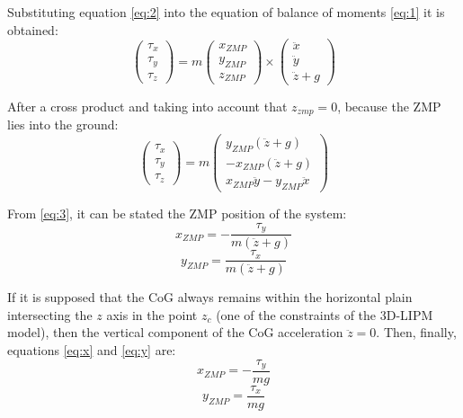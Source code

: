 Substituting equation \eqref{eq:2} into the equation of balance of moments \eqref{eq:1} it is obtained:
\begin{equation}
\begin{pmatrix}
\tau_x \\
\tau_y \\
\tau_z 
\end{pmatrix} 
= m
\begin{pmatrix}
x_{ZMP} \\
y_{ZMP} \\
z_{ZMP}
\end{pmatrix}
\times
\begin{pmatrix}
\ddot{x} \\
\ddot{y} \\
\ddot{z} + g
\end{pmatrix}
\end{equation}

After a cross product and taking into account that $z_{zmp} = 0$, because the ZMP lies into the ground:
\begin{equation}
\begin{pmatrix}
\tau_x \\
\tau_y \\
\tau_z 
\end{pmatrix} 
= m
\begin{pmatrix}
y_{ZMP}(\ddot{z}+g) \\
-x_{ZMP}(\ddot{z}+g) \\
x_{ZMP}\ddot{y}-y_{ZMP}\ddot{x}
\end{pmatrix}
\label{eq:3}
\end{equation}

From \eqref{eq:3}, it can be stated the ZMP position of the system:
\begin{equation}
x_{ZMP} = -\frac{\tau_y}{m(\ddot{z}+g)}
\label{eq:x}
\end{equation}
\begin{equation}
y_{ZMP} = \frac{\tau_x}{m(\ddot{z}+g)}
\label{eq:y}
\end{equation}

If it is supposed that the CoG always remains within the horizontal plain intersecting the $z$ axis in the point $z_c$ (one of the constraints of the 3D-LIPM model), then the vertical component of the CoG acceleration $\ddot{z}=0$. Then, finally, equations \eqref{eq:x} and \eqref{eq:y} are:
\begin{equation}
x_{ZMP} = -\frac{\tau_y}{mg}
\label{eq:xzmp}
\end{equation}
\begin{equation}
y_{ZMP} = \frac{\tau_x}{mg}
\label{eq:yzmp}
\end{equation}

